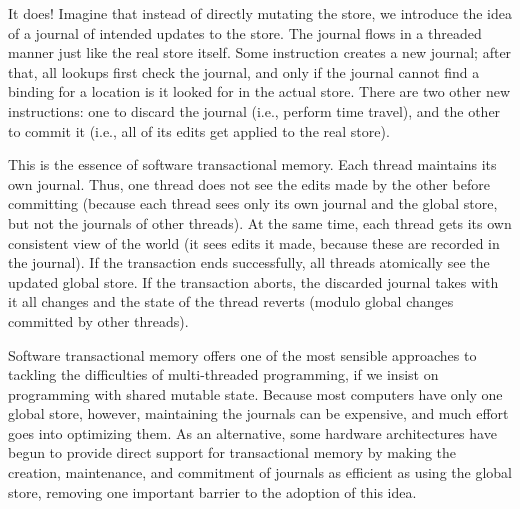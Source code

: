 \begin{enumerate}
It does! Imagine that instead of directly mutating the store, we introduce the
idea of a journal of intended updates to the store. The journal flows in a
threaded manner just like the real store itself. Some instruction creates a new
journal; after that, all lookups first check the journal, and only if the
journal cannot find a binding for a location is it looked for in the actual
store. There are two other new instructions: one to discard the journal (i.e.,
perform time travel), and the other to commit it (i.e., all of its edits get
applied to the real store).

This is the essence of software transactional memory. Each thread maintains its
own journal. Thus, one thread does not see the edits made by the other before
committing (because each thread sees only its own journal and the global store,
but not the journals of other threads). At the same time, each thread gets its
own consistent view of the world (it sees edits it made, because these are
recorded in the journal). If the transaction ends successfully, all threads
atomically see the updated global store. If the transaction aborts, the
discarded journal takes with it all changes and the state of the thread reverts
(modulo global changes committed by other threads).

Software transactional memory offers one of the most sensible approaches to
tackling the difficulties of multi-threaded programming, if we insist on
programming with shared mutable state. Because most computers have only one
global store, however, maintaining the journals can be expensive, and much
effort goes into optimizing them. As an alternative, some hardware architectures
have begun to provide direct support for transactional memory by making the
creation, maintenance, and commitment of journals as efficient as using the
global store, removing one important barrier to the adoption of this idea.


\end{enumerate}

